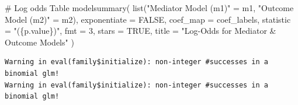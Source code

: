 \documentclass[
  letterpaper,
  DIV=11,
  numbers=noendperiod]{scrartcl}
\newenvironment{Shaded}{\begin{snugshade}}{\end{snugshade}}
\newcommand{\AttributeTok}[1]{\textcolor[rgb]{0.40,0.45,0.13}{#1}}
\newcommand{\CommentTok}[1]{\textcolor[rgb]{0.37,0.37,0.37}{#1}}
\newcommand{\ConstantTok}[1]{\textcolor[rgb]{0.56,0.35,0.01}{#1}}
\newcommand{\DecValTok}[1]{\textcolor[rgb]{0.68,0.00,0.00}{#1}}
\newcommand{\FunctionTok}[1]{\textcolor[rgb]{0.28,0.35,0.67}{#1}}
\newcommand{\NormalTok}[1]{\textcolor[rgb]{0.00,0.23,0.31}{#1}}
\newcommand{\OtherTok}[1]{\textcolor[rgb]{0.00,0.23,0.31}{#1}}
\newcommand{\StringTok}[1]{\textcolor[rgb]{0.13,0.47,0.30}{#1}}
\begin{document}
\begin{Shaded}
\begin{Highlighting}[]
\CommentTok{\# Log odds Table}
\FunctionTok{modelsummary}\NormalTok{(}
  \FunctionTok{list}\NormalTok{(}\StringTok{"Mediator Model (m1)"} \OtherTok{=}\NormalTok{ m1,}
       \StringTok{"Outcome Model (m2)"}   \OtherTok{=}\NormalTok{ m2),}
  \AttributeTok{exponentiate =} \ConstantTok{FALSE}\NormalTok{,}
  \AttributeTok{coef\_map =}\NormalTok{ coef\_labels,               }
  \AttributeTok{statistic    =} \StringTok{"(\{p.value\})"}\NormalTok{,}
  \AttributeTok{fmt          =} \DecValTok{3}\NormalTok{,}
  \AttributeTok{stars        =} \ConstantTok{TRUE}\NormalTok{,}
  \AttributeTok{title        =} \StringTok{"Log{-}Odds for Mediator \& Outcome Models"}
\NormalTok{) }
\end{Highlighting}
\end{Shaded}

\begin{verbatim}
Warning in eval(family$initialize): non-integer #successes in a binomial glm!
Warning in eval(family$initialize): non-integer #successes in a binomial glm!
\end{verbatim}
\end{document}
